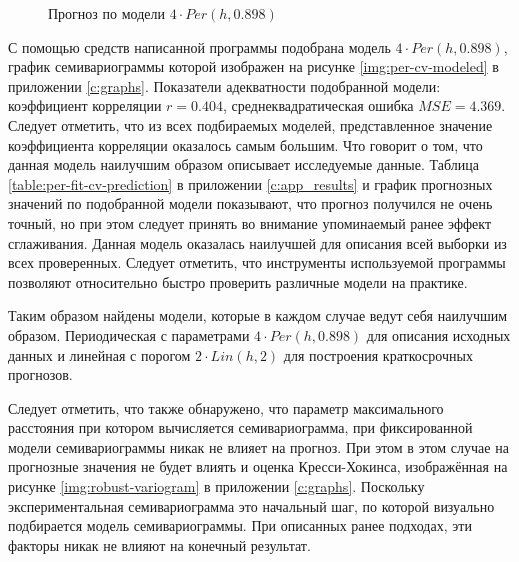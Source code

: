 \begin{figure}[ht]
\caption{Прогноз по модели $ 4 \cdot Per(h, 0.898) $}
\label{img:per-cv-pred}
\end{figure}
С помощью средств написанной программы подобрана модель $ 4 \cdot Per(h, 0.898) $, график семивариограммы которой изображен на рисунке \ref{img:per-cv-modeled} в приложении \ref{c:graphs}. Показатели адекватности подобранной модели: коэффициент корреляции $ r = 0.404 $, среднеквадратическая ошибка $ MSE = 4.369 $. Следует отметить, что из всех подбираемых моделей, представленное значение коэффициента корреляции оказалось самым большим. Что говорит о том, что данная модель наилучшим образом описывает исследуемые данные. Таблица \ref{table:per-fit-cv-prediction} в приложении \ref{c:app_results} и график прогнозных значений по подобранной модели показывают, что прогноз получился не очень точный, но при этом следует принять во внимание упоминаемый ранее эффект сглаживания. Данная модель оказалась наилучшей для описания всей выборки из всех проверенных. Следует отметить, что инструменты используемой программы позволяют относительно быстро проверить различные модели на практике.

Таким образом найдены модели, которые в каждом случае ведут себя наилучшим образом. Периодическая с параметрами $ 4 \cdot Per(h, 0.898) $ для описания исходных данных и линейная с порогом $ 2 \cdot Lin(h, 2) $ для построения краткосрочных прогнозов.

Следует отметить, что также обнаружено, что параметр максимального расстояния при котором вычисляется семивариограмма, при фиксированной модели семивариограммы никак не влияет на прогноз. При этом в этом случае на прогнозные значения не будет влиять и оценка Кресси-Хокинса, изображённая на рисунке \ref{img:robust-variogram} в приложении \ref{c:graphs}. Поскольку экспериментальная семивариограмма это начальный шаг, по которой визуально подбирается модель семивариограммы. При описанных ранее подходах, эти факторы никак не влияют на конечный результат.


